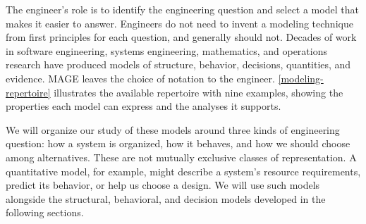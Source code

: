 
The engineer's role is to identify the engineering question and select a model that makes it easier to answer. Engineers do not need to invent a modeling technique from first principles for each question, and generally should not. Decades of work in software engineering, systems engineering, mathematics, and operations research have produced models of structure, behavior, decisions, quantities, and evidence. MAGE leaves the choice of notation to the engineer. \autoref{modeling-repertoire} illustrates the available repertoire with nine examples, showing the properties each model can express and the analyses it supports.

We will organize our study of these models around three kinds of engineering question: how a system is organized, how it behaves, and how we should choose among alternatives. These are not mutually exclusive classes of representation. A quantitative model, for example, might describe a system’s resource requirements, predict its behavior, or help us choose a design. We will use such models alongside the structural, behavioral, and decision models developed in the following sections.


